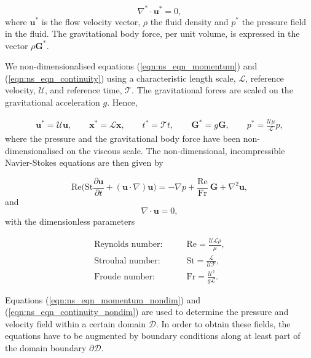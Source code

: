 \documentclass[aip,graphicx]{revtex4-1}
\newcommand{\sym}[1]{\text{#1}}
\newcommand{\pder}[2][]{\frac{\partial#1}{\partial#2}}
\newcommand{\vect}[1]{\bm{#1}}
\begin{document}
\begin{equation}
 \nabla^* \cdot \vect{u}^* = 0,
 \label{eqn:ns_eqn_continuity}
\end{equation}
where $\vect{u}^*$ is the flow velocity vector, $\rho$ the fluid density and $p^*$ the pressure field in the fluid. 
The gravitational body force, per unit volume, is expressed in the vector $\rho \vect{G}^*$. 

We non-dimensionalised equations (\ref{eqn:ns_eqn_momentum}) and (\ref{eqn:ns_eqn_continuity}) using a characteristic length scale, $\mathcal{L}$, reference velocity, $\mathcal{U}$, and reference time, $\mathcal{T}$. 
The gravitational forces are scaled on the gravitational acceleration $g$. 
Hence,

\begin{gather}
 \vect{u}^*=\mathcal{U} \vect{u}, \qquad \vect{x}^*=\mathcal{L} \vect{x}, \qquad t^*= \mathcal{T} t, \qquad \vect{G}^*=g \vect{G}, \qquad p^*= \frac{\mathcal{U} \mu}{\mathcal{L}} p,
 \label{eqn:ns_eqn_nondim}
\end{gather}
where the pressure and the gravitational body force have been non-dimensionalised on the viscous scale.
The non-dimensional, incompressible Navier-Stokes equations are then given by

\begin{equation}
 \sym{Re} \Bigg( \sym{St} \pder[\vect{u}]{t} + (\vect{u} \cdot \nabla) \vect{u} \Bigg) = - \nabla p + \frac{\sym{Re}}{\sym{Fr}} \: \vect{G} + \nabla^2 \vect{u},
 \label{eqn:ns_eqn_momentum_nondim}
\end{equation}
and
\begin{equation}
 \nabla \cdot \vect{u} = 0,
 \label{eqn:ns_eqn_continuity_nondim}
\end{equation}
with the dimensionless parameters

\begin{align*}
 \text{Reynolds number:} \qquad &\sym{Re}=\frac{\mathcal{UL} \rho}{\mu}, \\
 \text{Strouhal number:} \qquad &\sym{St}=\frac{\mathcal{L}}{\mathcal{UT}}, \\
 \text{Froude number:} \qquad &\sym{Fr}=\frac{\mathcal{U}^2}{g \mathcal{L}}.
\end{align*}

Equations (\ref{eqn:ns_eqn_momentum_nondim}) and (\ref{eqn:ns_eqn_continuity_nondim}) are used to determine the pressure and velocity field within a certain domain $\mathcal{D}$. 
In order to obtain these fields, the equations have to be augmented by boundary conditions along at least part of the domain boundary $\partial \mathcal{D}$.
\end{document}
